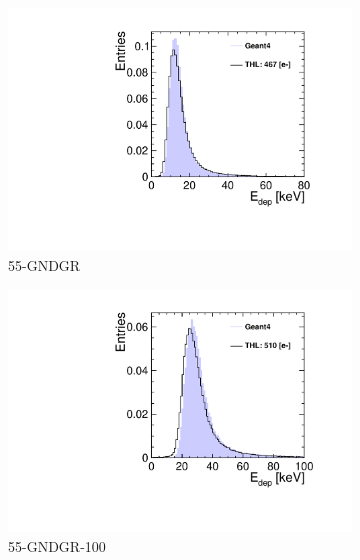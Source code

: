 \begin{figure}[htbp] \centering
  \begin{subfigure}[b]{0.33\textwidth}
    \includegraphics[width=\textwidth]{./figures/Calibration/Edep_G4_W0019_G07.pdf}
    \caption{55-GNDGR}
  \end{subfigure} \hfill
  \begin{subfigure}[b]{0.33\textwidth}
    \includegraphics[width=\textwidth]{./figures/Calibration/Edep_G4_W0005_E02.pdf}
    \caption{55-GNDGR-100}
  \end{subfigure}\hfill
  \begin{subfigure}[b]{0.33\textwidth}

\end{subfigure}
\end{figure}
